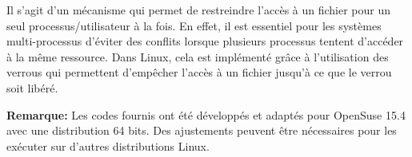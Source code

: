 Il s'agit d'un mécanisme qui permet de restreindre l'accès à un fichier pour un seul processus/utilisateur à la fois. En effet, il est essentiel pour les systèmes multi-processus d'éviter des conflits lorsque plusieurs processus tentent d'accéder à la même ressource. Dans Linux, cela est implémenté grâce à l'utilisation des verrous qui permettent d'empêcher l'accès à un fichier jusqu'à ce que le verrou soit libéré.

\textbf{Remarque:} Les codes fournis ont été développés et adaptés pour OpenSuse 15.4 avec une distribution 64 bits. Des ajustements peuvent être nécessaires pour les exécuter sur d'autres distributions Linux.